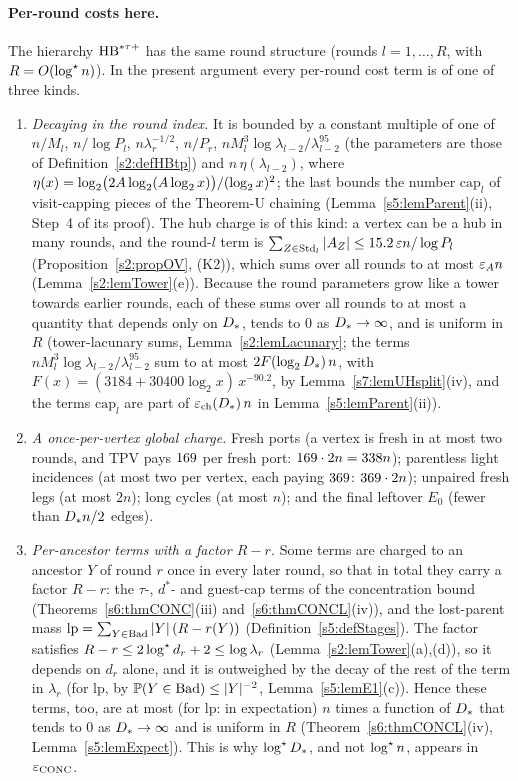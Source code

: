\paragraph{Per-round costs here.} The hierarchy $\mathrm{HB}^{*\tau{+}}$ has the same round
structure (rounds $l=1,\dots,R$, with $R=O(\log^{\star} n)$). In the present
argument every per-round cost term is of one of three kinds.
\begin{enumerate}
\item[(a)] \emph{Decaying in the round index.} It is bounded by a constant
multiple of one of $n/M_l$, $n/\log P_l$, $n\lambda_r^{-1/2}$, $n/P_r$,
$n M_l^3\log\lambda_{l-2}/\lambda_{l-2}^{95}$ (the parameters are those of
Definition~\ref{s2:defHBtp}) and $n\,\eta(\lambda_{l-2})$, where
$\eta(x)=\log_2\bigl(2A\log_2(A\log_2x)\bigr)/(\log_2x)^2$; the last
bounds the number $\mathrm{cap}_l$ of visit-capping pieces of the Theorem-U
chaining (Lemma~\ref{s5:lemParent}(ii), Step~4 of its proof). The hub charge is
of this kind: a vertex can be a hub in many rounds, and the round-$l$ term is
$\sum_{Z\in\mathrm{Std}_l}|A_Z|\le15.2\,\varepsilon n/\log P_l$ (Proposition~\ref{s2:propOV},
(K2)), which sums over all rounds to at most $\varepsilon_{A} n$
(Lemma~\ref{s2:lemTower}(e)). Because the round
parameters grow like a tower towards earlier rounds, each of these sums over all
rounds to at most a quantity that depends only on $D_{*}$, tends to $0$ as
$D_{*}\to\infty$, and is uniform in $R$ (tower-lacunary sums,
Lemma~\ref{s2:lemLacunary}; the terms
$nM_l^3\log\lambda_{l-2}/\lambda_{l-2}^{95}$ sum to at most
$2F(\log_2D_{*})\,n$, with $F(x)=(3184+30400\log_2x)\,x^{-90.2}$, by
Lemma~\ref{s7:lemUHsplit}(iv), and the terms $\mathrm{cap}_l$ are part of
$\varepsilon_{\mathrm{ch}}(D_{*})\,n$ in Lemma~\ref{s5:lemParent}(ii)).
\item[(b)] \emph{A once-per-vertex global charge.} Fresh ports (a vertex is fresh
in at most two rounds, and TPV pays $169$ per fresh port: $169\cdot2n=338
n$); parentless light incidences (at most two per vertex, each paying $369$:
$369\cdot 2n$); unpaired fresh legs (at most $2n$); long cycles (at most $n$); and the final leftover
$E_0$ (fewer than $D_{*} n/2$ edges).
\item[(c)] \emph{Per-ancestor terms with a factor $R-r$.} Some terms are charged
to an ancestor $Y$ of round $r$ once in every later round, so that in total they
carry a factor $R-r$: the $\tau$-, $d^*$- and guest-cap terms of the
concentration bound (Theorems~\ref{s6:thmCONC}(iii) and~\ref{s6:thmCONCL}(iv)),
and the lost-parent mass $\mathrm{lp}=\sum_{Y\in\mathrm{Bad}}|Y|\,(R-r(Y))$
(Definition~\ref{s5:defStages}). The factor satisfies
$R-r\le2\log^{\star} d_r+2\le\log\lambda_r$ (Lemma~\ref{s2:lemTower}(a),(d)), so it
depends on $d_r$ alone, and it is outweighed by the decay of the rest of the term
in $\lambda_r$ (for $\mathrm{lp}$, by $\mathbb{P}(Y\in\mathrm{Bad})\le|Y|^{-2}$,
Lemma~\ref{s5:lemE1}(c)). Hence these terms, too, are at most (for
$\mathrm{lp}$: in expectation) $n$ times a function of $D_{*}$ that tends to
$0$ as $D_{*}\to\infty$ and is uniform in $R$
(Theorem~\ref{s6:thmCONCL}(iv), Lemma~\ref{s5:lemExpect}). This is why
$\log^{\star}D_{*}$, and not $\log^{\star} n$, appears in $\varepsilon_{\mathrm{CONC}}$.
\end{enumerate}

